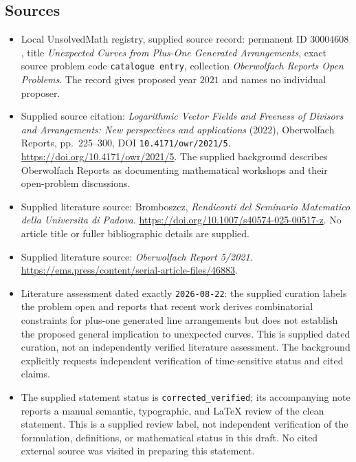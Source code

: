 \documentclass[11pt]{article}
\begin{document}
\subsection{Sources}
\begin{itemize}
\item Local UnsolvedMath registry, supplied source record: permanent ID \(30004608\), title \emph{Unexpected Curves from Plus-One Generated Arrangements}, exact source problem code \texttt{catalogue entry}, collection \emph{Oberwolfach Reports Open Problems}. The record gives proposed year \(2021\) and names no individual proposer.
\item Supplied source citation: \emph{Logarithmic Vector Fields and Freeness of Divisors and Arrangements: New perspectives and applications} (2022), Oberwolfach Reports, pp.\ 225--300, DOI \texttt{10.4171/owr/2021/5}. \url{https://doi.org/10.4171/owr/2021/5}. The supplied background describes Oberwolfach Reports as documenting mathematical workshops and their open-problem discussions.
\item Supplied literature source: Bromboszcz, \emph{Rendiconti del Seminario Matematico della Universita di Padova}. \url{https://doi.org/10.1007/s40574-025-00517-z}. No article title or fuller bibliographic details are supplied.
\item Supplied literature source: \emph{Oberwolfach Report 5/2021}. \url{https://ems.press/content/serial-article-files/46883}.
\item Literature assessment dated exactly \texttt{2026-08-22}: the supplied curation labels the problem open and reports that recent work derives combinatorial constraints for plus-one generated line arrangements but does not establish the proposed general implication to unexpected curves. This is supplied dated curation, not an independently verified literature assessment. The background explicitly requests independent verification of time-sensitive status and cited claims.
\item The supplied statement status is \texttt{corrected\_verified}; its accompanying note reports a manual semantic, typographic, and LaTeX review of the clean statement. This is a supplied review label, not independent verification of the formulation, definitions, or mathematical status in this draft. No cited external source was visited in preparing this statement.
\end{itemize}
\end{document}
